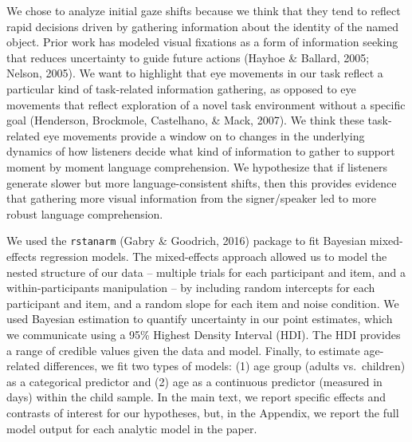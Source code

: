 \documentclass[,man,floatsintext]{apa6}
\begin{document}
We chose to analyze initial gaze shifts because we think that they tend
to reflect rapid decisions driven by gathering information about the
identity of the named object. Prior work has modeled visual fixations as
a form of information seeking that reduces uncertainty to guide future
actions (Hayhoe \& Ballard, 2005; Nelson, 2005). We want to highlight
that eye movements in our task reflect a particular kind of task-related
information gathering, as opposed to eye movements that reflect
exploration of a novel task environment without a specific goal
(Henderson, Brockmole, Castelhano, \& Mack, 2007). We think these
task-related eye movements provide a window on to changes in the
underlying dynamics of how listeners decide what kind of information to
gather to support moment by moment language comprehension. We
hypothesize that if listeners generate slower but more
language-consistent shifts, then this provides evidence that gathering
more visual information from the signer/speaker led to more robust
language comprehension.

We used the \texttt{rstanarm} (Gabry \& Goodrich, 2016) package to fit
Bayesian mixed-effects regression models. The mixed-effects approach
allowed us to model the nested structure of our data -- multiple trials
for each participant and item, and a within-participants manipulation --
by including random intercepts for each participant and item, and a
random slope for each item and noise condition. We used Bayesian
estimation to quantify uncertainty in our point estimates, which we
communicate using a 95\% Highest Density Interval (HDI). The HDI
provides a range of credible values given the data and model. Finally,
to estimate age-related differences, we fit two types of models: (1) age
group (adults vs.~children) as a categorical predictor and (2) age as a
continuous predictor (measured in days) within the child sample. In the
main text, we report specific effects and contrasts of interest for our
hypotheses, but, in the Appendix, we report the full model output for
each analytic model in the paper.
\end{document}

